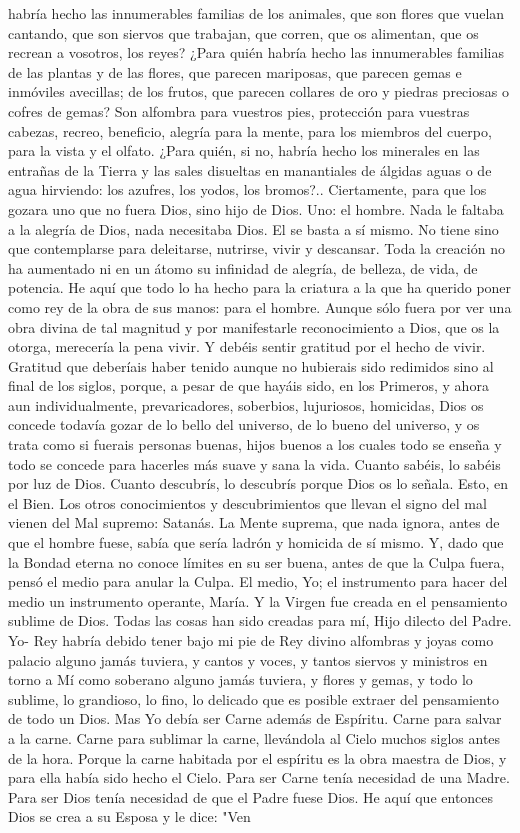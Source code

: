 \documentclass[12pt, twoside, openright]{book} %
\begin{document}
habría hecho las innumerables familias de los animales, que son flores que vuelan cantando, que son siervos que trabajan, que corren, que os alimentan, que os recrean a vosotros, los reyes? ¿Para quién habría hecho las innumerables familias de las plantas y de las flores, que parecen mariposas, que parecen gemas e inmóviles avecillas; de los frutos, que parecen collares de oro y piedras preciosas o cofres de gemas? Son alfombra para vuestros pies, protección para vuestras cabezas, recreo, beneficio, alegría para la mente, para los miembros del cuerpo, para la vista y el olfato. ¿Para quién, si no, habría hecho los minerales en las entrañas de la Tierra y las sales disueltas en manantiales de álgidas aguas o de agua hirviendo: los azufres, los yodos, los bromos?.. Ciertamente, para que los gozara uno que no fuera Dios, sino hijo de Dios. Uno: el hombre. Nada le faltaba a la alegría de Dios, nada necesitaba Dios. El se basta a sí mismo. No tiene sino que contemplarse para deleitarse, nutrirse, vivir y descansar. Toda la creación no ha aumentado ni en un átomo su infinidad de alegría, de belleza, de vida, de potencia. He aquí que todo lo ha hecho para la criatura a la que ha querido poner como rey de la obra de sus manos: para el hombre. Aunque sólo fuera por ver una obra divina de tal magnitud y por manifestarle reconocimiento a Dios, que os la otorga, merecería la pena vivir. Y debéis sentir gratitud por el hecho de vivir. Gratitud que deberíais haber tenido aunque no hubierais sido redimidos sino al final de los siglos, porque, a pesar de que hayáis sido, en los Primeros, y ahora aun individualmente, prevaricadores, soberbios, lujuriosos, homicidas, Dios os concede todavía gozar de lo bello del universo, de lo bueno del universo, y os trata como si fuerais personas buenas, hijos buenos a los cuales todo se enseña y todo se concede para hacerles más suave y sana la vida. Cuanto sabéis, lo sabéis por luz de Dios. Cuanto descubrís, lo descubrís porque Dios os lo señala. Esto, en el Bien. Los otros conocimientos y descubrimientos que llevan el signo del mal vienen del Mal supremo: Satanás. La Mente suprema, que nada ignora, antes de que el hombre fuese, sabía que sería ladrón y homicida de sí mismo. Y, dado que la Bondad eterna no conoce límites en su ser buena, antes de que la Culpa fuera, pensó el medio para anular la Culpa. El medio, Yo; el instrumento para hacer del medio un instrumento operante, María. Y la Virgen fue creada en el pensamiento sublime de Dios. Todas las cosas han sido creadas para mí, Hijo dilecto del Padre. Yo- Rey habría debido tener bajo mi pie de Rey divino alfombras y joyas como palacio alguno jamás tuviera, y cantos y voces, y tantos siervos y ministros en torno a Mí como soberano alguno jamás tuviera, y flores y gemas, y todo lo sublime, lo grandioso, lo fino, lo delicado que es posible extraer del pensamiento de todo un Dios. Mas Yo debía ser Carne además de Espíritu. Carne para salvar a la carne. Carne para sublimar la carne, llevándola al Cielo muchos siglos antes de la hora. Porque la carne habitada por el espíritu es la obra maestra de Dios, y para ella había sido hecho el Cielo. Para ser Carne tenía necesidad de una Madre. Para ser Dios tenía necesidad de que el Padre fuese Dios. He aquí que entonces Dios se crea a su Esposa y le dice: "Ven 
\end{document}
